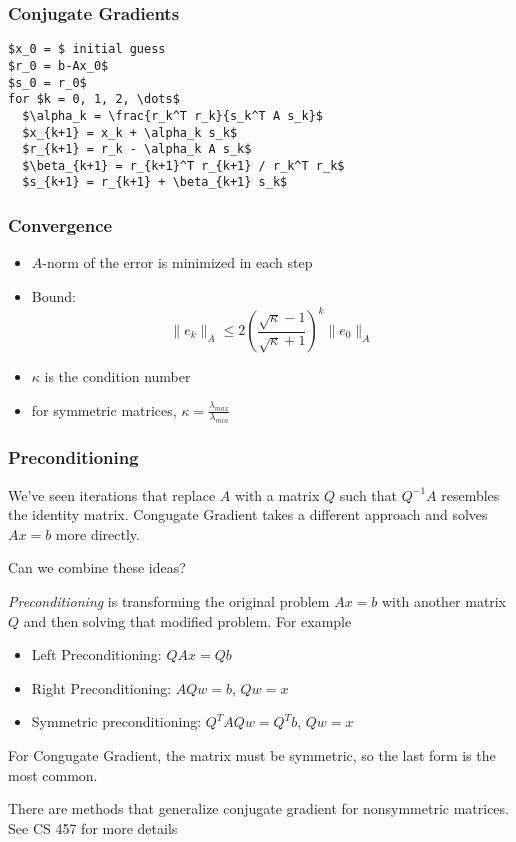 \documentclass[10pt]{beamer}
\begin{document}
\begin{frame}[fragile]
\frametitle{Conjugate Gradients}
\begin{lstlisting}[mathescape]
$x_0 = $ initial guess
$r_0 = b-Ax_0$
$s_0 = r_0$
for $k = 0, 1, 2, \dots$
  $\alpha_k = \frac{r_k^T r_k}{s_k^T A s_k}$
  $x_{k+1} = x_k + \alpha_k s_k$
  $r_{k+1} = r_k - \alpha_k A s_k$
  $\beta_{k+1} = r_{k+1}^T r_{k+1} / r_k^T r_k$
  $s_{k+1} = r_{k+1} + \beta_{k+1} s_k$
\end{lstlisting}
\end{frame}
\begin{frame}
\frametitle{Convergence}
\begin{itemize}
  \item $A$-norm of the error is minimized in each step
  \item Bound:
  \[
  \|e_k\|_A \leq 2 \left( \frac{\sqrt{\kappa} -1}{\sqrt{\kappa} + 1} \right)^k
\|e_0 \|_A
\]
  \item $\kappa$ is the condition number
  \item for symmetric matrices, $\kappa = \frac{\lambda_{max}}{\lambda_{min}}$
\end{itemize}
\end{frame}
\begin{frame}
\frametitle{Preconditioning}
We've seen iterations that replace $A$ with a matrix $Q$ such that
$Q^{-1}A$ resembles the identity matrix. Congugate Gradient takes a
different approach and solves $Ax=b$ more directly.

Can we combine these ideas?

\emph{Preconditioning} is transforming the original problem $Ax=b$
with another matrix $Q$ and then solving that modified problem.  For
example
\begin{itemize}
\item Left Preconditioning: $QAx = Qb$
\item Right Preconditioning: $AQw = b$, $Qw=x$
\item Symmetric preconditioning: $Q^TAQw = Q^Tb$, $Qw=x$
\end{itemize}
For Congugate Gradient, the matrix must be symmetric, so the last form
is the most common. 

There are methods that generalize conjugate gradient for nonsymmetric
matrices.  See CS 457 for more details
\end{frame}
\end{document}
